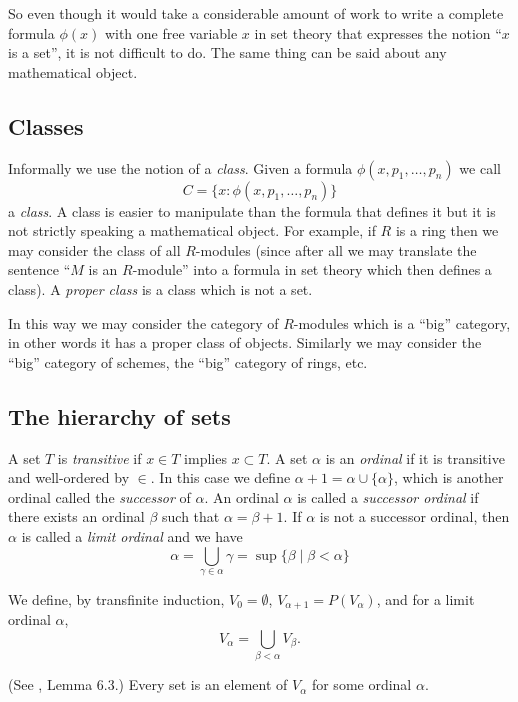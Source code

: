 \medskip\noindent
So even though it would take a considerable amount of work to write
a complete formula $\phi(x)$ with one free variable $x$ in set theory 
that expresses the notion ``$x$ is a set'', it is not difficult to do.
The same thing can be said about any mathematical object.

\subsection{Classes}
\label{subsection-classes}

\noindent
Informally we use the notion of a {\it class}. Given a formula
$\phi(x,p_1,\ldots,p_n)$ we call
$$
C = \{x : \phi(x,p_1,\ldots,p_n)\}
$$
a {\it class}. A class is easier to manipulate than the formula
that defines it but it is not strictly speaking a mathematical
object. For example, if $R$ is a ring then we may
consider the class of all $R$-modules (since after all we
may translate the sentence ``$M$ is an $R$-module''
into a formula in set theory which then defines a class).
A {\it proper class} is a class which is not a set.

\noindent
In this way we may consider the category of $R$-modules
which is a ``big'' category, in other words it has a
proper  class of objects. Similarly we may consider
the ``big'' category of schemes, the ``big'' category
of rings, etc.

\subsection{The hierarchy of sets}
\label{subsection-sets-hierarchy}

\noindent
A set $T$ is {\it transitive} if $x\in T$ implies $x\subset T$.
A set $\alpha$ is an {\it ordinal} if it is transitive and well-ordered
by $\in$. In this case we define $\alpha + 1 = \alpha \cup \{\alpha\}$,
which is another ordinal called the {\it successor} of $\alpha$.
An ordinal $\alpha$ is called a {\it successor ordinal} if 
there exists an ordinal $\beta$ such that $\alpha = \beta + 1$.
If $\alpha$ is not a successor ordinal, then $\alpha$ is called
a {\it limit ordinal} and we have
$$
\alpha 
=
\bigcup_{\gamma \in \alpha} \gamma
=
\sup \{\beta \mid \beta < \alpha \}
$$

\medskip\noindent
We define, by transfinite induction, $V_0 = \emptyset$,
$V_{\alpha + 1} = P(V_\alpha)$, and for a limit ordinal $\alpha$,
$$
V_\alpha = \bigcup_{\beta < \alpha} V_\beta.
$$

\begin{lemma}
\label{axiom-regularity}
(See \cite{Jech}, Lemma 6.3.)
Every set is an element of $V_\alpha$ for some ordinal $\alpha$.
\end{lemma}

